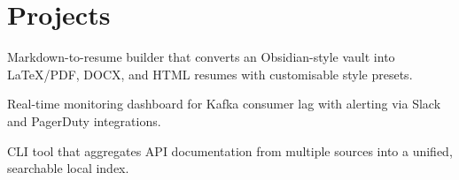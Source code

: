 
\section{Projects}



Markdown-to-resume builder that converts an Obsidian-style vault into LaTeX/PDF, DOCX, and HTML resumes with customisable style presets.





Real-time monitoring dashboard for Kafka consumer lag with alerting via Slack and PagerDuty integrations.





CLI tool that aggregates API documentation from multiple sources into a unified, searchable local index.





